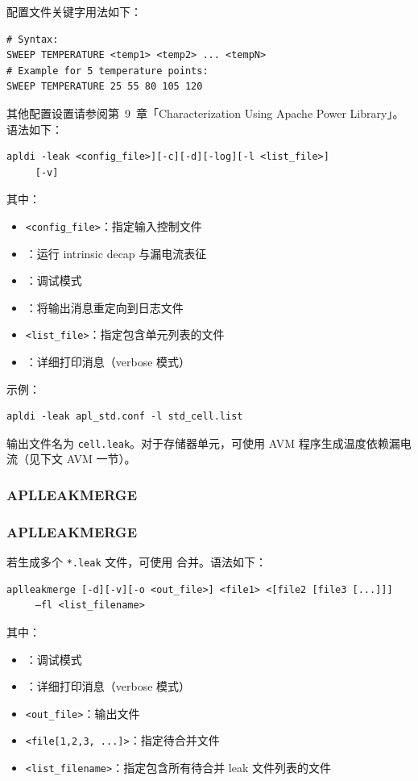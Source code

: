  配置文件关键字用法如下：
\begin{lstlisting}
# Syntax:
SWEEP TEMPERATURE <temp1> <temp2> ... <tempN>
# Example for 5 temperature points:
SWEEP TEMPERATURE 25 55 80 105 120
\end{lstlisting}

其他配置设置请参阅第~9~章「Characterization Using Apache Power Library」。 语法如下：
\begin{lstlisting}
apldi -leak <config_file>][-c][-d][-log][-l <list_file>]
     [-v]
\end{lstlisting}
其中：
\begin{itemize}
  \item \texttt{<config\_file>}：指定输入控制文件
  \item {}：运行 intrinsic decap 与漏电流表征
  \item {}：调试模式
  \item {}：将输出消息重定向到日志文件
  \item {} \texttt{<list\_file>}：指定包含单元列表的文件
  \item {}：详细打印消息（verbose 模式）
\end{itemize}

示例：
\begin{lstlisting}
apldi -leak apl_std.conf -l std_cell.list
\end{lstlisting}

输出文件名为 \texttt{cell.leak}。对于存储器单元，可使用 AVM 程序生成温度依赖漏电流（见下文 AVM 一节）。

\subsubsection{APLLEAKMERGE}
\subsubsection*{APLLEAKMERGE}

若生成多个 \texttt{*.leak} 文件，可使用  合并。语法如下：
\begin{lstlisting}
aplleakmerge [-d][-v][-o <out_file>] <file1> <[file2 [file3 [...]]]
     –fl <list_filename>
\end{lstlisting}
其中：
\begin{itemize}
  \item {}：调试模式
  \item {}：详细打印消息（verbose 模式）
  \item {} \texttt{<out\_file>}：输出文件
  \item \texttt{<file[1,2,3, ...]>}：指定待合并文件
  \item {} \texttt{<list\_filename>}：指定包含所有待合并 leak 文件列表的文件
\end{itemize}

